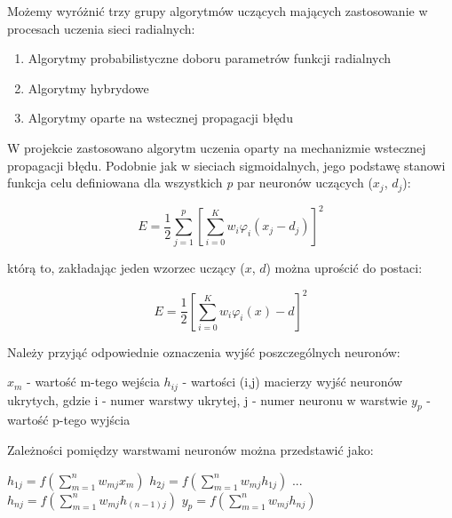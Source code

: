 \documentclass[12pt]{article}
\begin{document}
Możemy wyróżnić trzy grupy algorytmów uczących mających zastosowanie w procesach uczenia sieci radialnych:

\begin{enumerate}

\item Algorytmy probabilistyczne doboru parametrów funkcji radialnych
\item Algorytmy hybrydowe 
\item Algorytmy oparte na wstecznej propagacji błędu

\end{enumerate}

W projekcie zastosowano algorytm uczenia oparty na mechanizmie wstecznej propagacji błędu. Podobnie jak w sieciach sigmoidalnych, jego podstawę stanowi funkcja celu definiowana dla wszystkich \textsl{p} par neuronów uczących ($x_j$, $d_j$):

\[ E = \frac{1}{2} \sum_{j=1}^{p} [\sum_{i=0}^{K} w_i\varphi_{i}(x_{j} - d_j)]^2 \]

którą to, zakładając jeden wzorzec uczący ($x$, $d$) można uprościć do postaci:

\[ E = \frac{1}{2}  [\sum_{i=0}^{K} w_i\varphi_{i}(x) - d]^2 \]

Należy przyjąć odpowiednie oznaczenia wyjść poszczególnych neuronów:

\begin{flushleft}
$x_m$ - wartość m-tego wejścia \newline
$h_{ij}$ - wartości (i,j) macierzy wyjść neuronów ukrytych, gdzie i - numer warstwy ukrytej, j - numer neuronu w warstwie \newline
$y_p$ - wartość p-tego wyjścia \newline
\end{flushleft}


Zależności pomiędzy warstwami neuronów można przedstawić jako: \newline

\begin{flushleft}
$h_{1j} = f(\sum_{m=1}^{n} w_{mj}x_m)$ \newline
$h_{2j} = f(\sum_{m=1}^{n} w_{mj}h_{1j})$ \newline
... \newline
$h_{nj} = f(\sum_{m=1}^{n} w_{mj}h_{(n-1)j})$ \newline
$y_p = f(\sum_{m=1}^{n} w_{mj}h_{nj})$ \newline
\end{flushleft}
\end{document}
